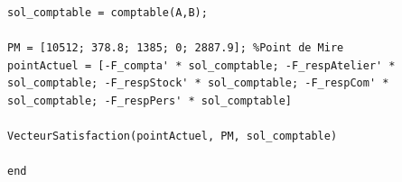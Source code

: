 \documentclass[a4paper, 11pt]{article}
\begin{document}
\begin{lstlisting}
sol_comptable = comptable(A,B);

PM = [10512; 378.8; 1385; 0; 2887.9]; %Point de Mire  
pointActuel = [-F_compta' * sol_comptable; -F_respAtelier' * sol_comptable; -F_respStock' * sol_comptable; -F_respCom' * sol_comptable; -F_respPers' * sol_comptable]

VecteurSatisfaction(pointActuel, PM, sol_comptable)

end
\end{lstlisting}
\end{document}
